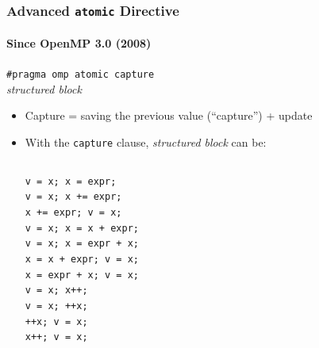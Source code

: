 \documentclass{beamer}
\begin{document}
\begin{frame}[fragile=singleslide]
  \frametitle{Advanced \texttt{atomic} Directive}
  \framesubtitle{Since OpenMP 3.0 (2008)} 
  
  {\scriptsize 
    \begin{framed}
      {\tt \#pragma omp atomic \alert{capture}}\\ 
      \textit{structured block}
    \end{framed}
  }

  \begin{itemize}
  \item Capture = saving the previous value (``capture'') + update 
    
  \item With the \texttt{capture} clause, \textit{structured block} can be: 

\begin{center}
  \begin{columns}[t]
    \texttt{{v = x; x = expr;}}\\
    \texttt{{v = x; x += expr;}}\\
    \texttt{{x += expr; v = x;}}\\
    \texttt{{v = x; x = x + expr;}}\\
    \texttt{{v = x; x = expr + x;}}\\
    \texttt{{x = x + expr; v = x;}}\\
    \texttt{{x = expr + x; v = x;}}\\
    
      \texttt{{v = x; x++;}}\\
      \texttt{{v = x; ++x;}}\\
      \texttt{{++x; v = x;}}\\
      \texttt{{x++; v = x;}}\\
  \end{columns}
\end{center}

\end{itemize}    
\end{frame}

\end{document}

